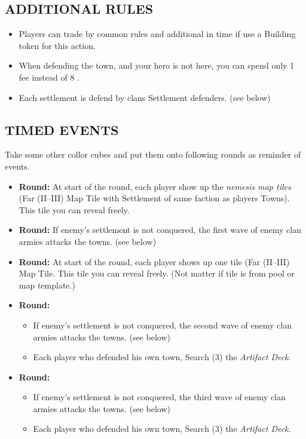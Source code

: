 \begin{multicols*}{2}
\subsection*{\MakeUppercase{Additional Rules}}

\begin{itemize}
  \item Players can trade by common rules and additional in time if use a Building token for this action.
  \item When defending the town, and your hero is not here, you can spend only 1  fee instead of 8 .
  \item Each settlement is defend by clans Settlement defenders. (see below)
\end{itemize}

\subsection*{\MakeUppercase{Timed Events}}

  Take some other collor cubes and put them onto following rounds as reminder of events.

  \begin{itemize}
   \item \textbf{ Round:}
      At start of the round, each player show up the \textit{nemesis map tiles} (Far (II--III) Map Tile with Settlement of same faction as players Towns). This tile you can reveal freely.
   \item \textbf{ Round:}
      If enemy's settlement is not conquered, the first wave of enemy clan armies attacks the towns. (see below)
   \item \textbf{ Round:}
      At start of the round, each player shows up one tile (Far (II--III) Map Tile. This tile you can reveal freely. (Not matter if tile is from pool or map template.)
   \item \textbf{ Round:}
    \begin{itemize}
      \item If enemy's settlement is not conquered, the second wave of enemy clan armies attacks the towns. (see below)
      \item Each player who defended his own town, Search (3) the \textit{Artifact Deck}.
     \end{itemize}
   \item \textbf{ Round:}
    \begin{itemize}
      \item If enemy's settlement is not conquered, the third wave of enemy clan armies attacks the towns. (see below)
      \item Each player who defended his own town, Search (3) the \textit{Artifact Deck}.
    \end{itemize}
  \end{itemize}


\end{multicols*}
